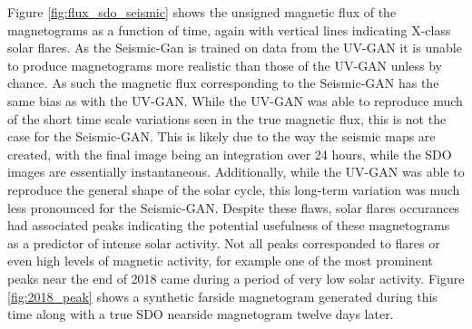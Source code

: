 \documentclass[11pt,a4paper,onecolumn]{report}
\begin{document}
Figure \ref{fig:flux_sdo_seismic} shows the unsigned magnetic flux of the
magnetograms as a function of time, again with vertical lines indicating X-class
solar flares. As the Seismic-Gan is trained on data from the UV-GAN it is unable
to produce magnetograms more realistic than those of the UV-GAN unless by
chance. As such the magnetic flux corresponding to the Seismic-GAN has the same
bias as with the UV-GAN. While the UV-GAN was able to reproduce much of the
short time scale variations seen in the true magnetic flux, this is not the case
for the Seismic-GAN. This is likely due to the way the seismic maps are created,
with the final image being an integration over 24 hours, while the SDO images
are essentially instantaneous. Additionally, while the UV-GAN was able to
reproduce the general shape of the solar cycle, this long-term variation was
much less pronounced for the Seismic-GAN. Despite these flaws, solar flares
occurances had associated peaks indicating the potential usefulness of these
magnetograms as a predictor of intense solar activity. Not all peaks
corresponded to flares or even high levels of magnetic activity, for example one
of the most prominent peaks near the end of 2018 came during a period of very
low solar activity. Figure \ref{fig:2018_peak} shows a synthetic farside
magnetogram generated during this time along with a true SDO nearside
magnetogram twelve days later.
\end{document}

